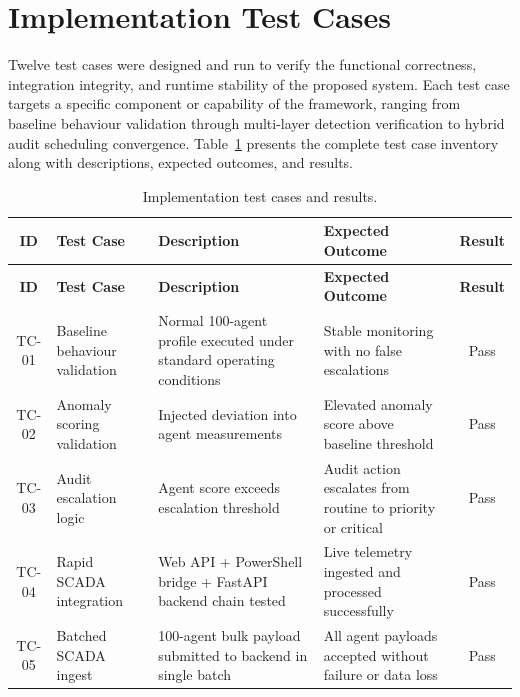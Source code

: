 
\section{Implementation Test Cases}

Twelve test cases were designed and run to verify the functional correctness, integration integrity, and runtime stability of the proposed system. Each test case targets a specific component or capability of the framework, ranging from baseline behaviour validation through multi-layer detection verification to hybrid audit scheduling convergence. Table~\ref{tab:test_cases} presents the complete test case inventory along with descriptions, expected outcomes, and results.

\begin{longtable}{|c|p{3cm}|p{4.5cm}|p{3.5cm}|c|}
\caption{Implementation test cases and results.}
\label{tab:test_cases} \\
\hline
\textbf{ID} & \textbf{Test Case} & \textbf{Description} & \textbf{Expected Outcome} & \textbf{Result} \\ \hline
\endfirsthead
\hline
\textbf{ID} & \textbf{Test Case} & \textbf{Description} & \textbf{Expected Outcome} & \textbf{Result} \\ \hline
\endhead
\hline
\endfoot

TC-01 & Baseline behaviour validation & Normal 100-agent profile executed under standard operating conditions & Stable monitoring with no false escalations & Pass \\ \hline

TC-02 & Anomaly scoring validation & Injected deviation into agent measurements & Elevated anomaly score above baseline threshold & Pass \\ \hline

TC-03 & Audit escalation logic & Agent score exceeds escalation threshold & Audit action escalates from routine to priority or critical & Pass \\ \hline

TC-04 & Rapid SCADA integration & Web API + PowerShell bridge + FastAPI backend chain tested & Live telemetry ingested and processed successfully & Pass \\ \hline

TC-05 & Batched SCADA ingest & 100-agent bulk payload submitted to backend in single batch & All agent payloads accepted without failure or data loss & Pass \\ \hline


\end{longtable}
